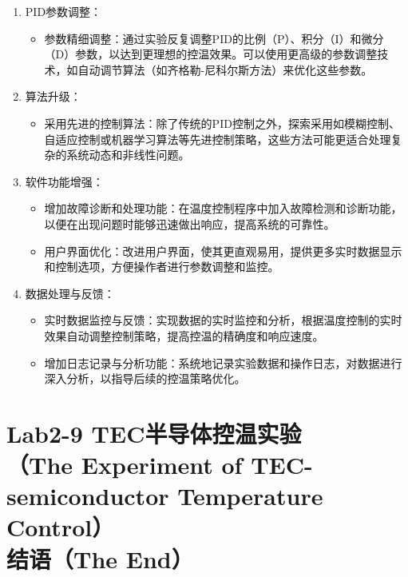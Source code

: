 \documentclass[dvipsnames, svgnames,a4paper,11pt]{article}
\begin{document}
	\begin{enumerate}
		\item PID参数调整：
		\begin{itemize}
			\item 参数精细调整：通过实验反复调整PID的比例（P）、积分（I）和微分（D）参数，以达到更理想的控温效果。可以使用更高级的参数调整技术，如自动调节算法（如齐格勒-尼科尔斯方法）来优化这些参数。
		\end{itemize}
		
		\item 算法升级：
		\begin{itemize}
			\item 采用先进的控制算法：除了传统的PID控制之外，探索采用如模糊控制、自适应控制或机器学习算法等先进控制策略，这些方法可能更适合处理复杂的系统动态和非线性问题。
		\end{itemize}
		
		\item 软件功能增强：
		\begin{itemize}
			\item 增加故障诊断和处理功能：在温度控制程序中加入故障检测和诊断功能，以便在出现问题时能够迅速做出响应，提高系统的可靠性。
			\item 用户界面优化：改进用户界面，使其更直观易用，提供更多实时数据显示和控制选项，方便操作者进行参数调整和监控。
		\end{itemize}
		
		\item 数据处理与反馈：
		\begin{itemize}
			\item 实时数据监控与反馈：实现数据的实时监控和分析，根据温度控制的实时效果自动调整控制策略，提高控温的精确度和响应速度。
			\item 增加日志记录与分析功能：系统地记录实验数据和操作日志，对数据进行深入分析，以指导后续的控温策略优化。
		\end{itemize}
	\end{enumerate}
	
	
	
	
	\clearpage
	
	\section{Lab2-9 TEC半导体控温实验\\（The Experiment of TEC-semiconductor Temperature Control）\\ \quad\heiti 结语（The End）}
	
\end{document}
